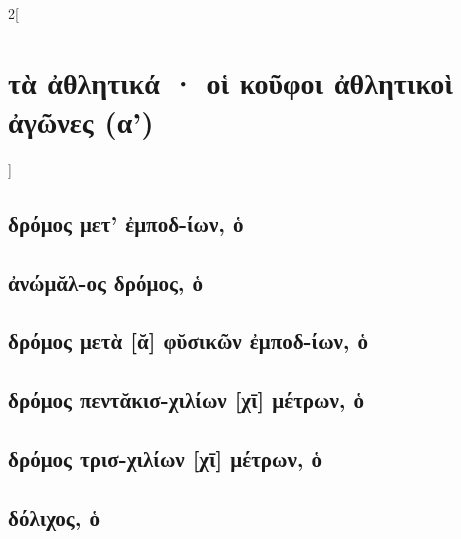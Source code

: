 \documentclass{book}
\begin{document}
\begin{multicols}{2}[\section{τὰ ἀθλητικά · οἱ κοῦφοι ἀθλητικοὶ ἀγῶνες (α')}]
\subsection{δρόμος μετ' ἐμποδ-ίων, ὁ}
\subsection{ἀνώμᾰλ-ος δρόμος, ὁ}
\subsection{δρόμος μετὰ [ᾰ] φῠσικῶν ἐμποδ-ίων, ὁ}
\subsection{δρόμος πεντᾰκισ-χιλίων [χῑ] μέτρων, ὁ}
\subsection{δρόμος τρισ-χιλίων [χῑ] μέτρων, ὁ}
\subsection{δόλιχος, ὁ}
~
\end{multicols}
\newpage 
\end{document}
